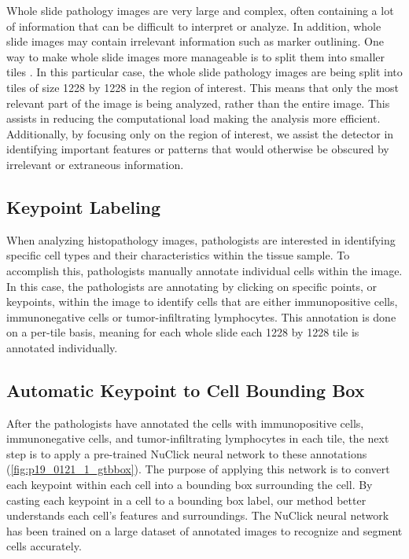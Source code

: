 \documentclass[runningheads]{llncs}
\begin{document}
Whole slide pathology images are very large and complex, often containing a lot of information that can be difficult to interpret or analyze. In addition, whole slide images may contain irrelevant information such as marker outlining.  One way to make whole slide images more manageable is to split them into smaller tiles \cite{dimitriou2019deep}. In this particular case, the whole slide pathology images are being split into tiles of size 1228 by 1228 in the region of interest. This means that only the most relevant part of the image is being analyzed, rather than the entire image. This assists in reducing the computational load making the analysis more efficient. Additionally, by focusing only on the region of interest, we assist the detector in identifying important features or patterns that would otherwise be obscured by irrelevant or extraneous information.

\subsection{Keypoint Labeling}

When analyzing histopathology images, pathologists are interested in identifying specific cell types and their characteristics within the tissue sample. To accomplish this, pathologists manually annotate individual cells within the image. In this case, the pathologists are annotating by clicking on specific points, or keypoints, within the image to identify cells that are either immunopositive cells, immunonegative cells or tumor-infiltrating lymphocytes. This annotation is done on a per-tile basis, meaning for each whole slide each 1228 by 1228 tile is annotated individually.

\subsection{Automatic Keypoint to Cell Bounding Box}

After the pathologists have annotated the cells with immunopositive cells, immunonegative cells, and tumor-infiltrating lymphocytes in each tile, the next step is to apply a pre-trained NuClick neural network to these annotations (\ref{fig:p19_0121_1_gtbbox}). The purpose of applying this network is to convert each keypoint within each cell into a bounding box surrounding the cell. By casting each keypoint in a cell to a bounding box label, our method better understands each cell's features and surroundings. The NuClick neural network has been trained on a large dataset of annotated images to recognize and segment cells accurately.
\end{document}
